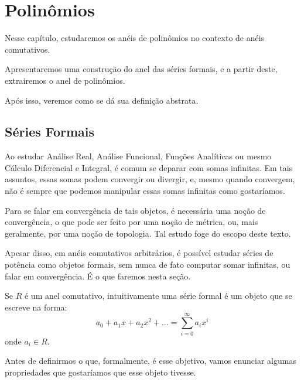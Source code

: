 
\chapter{Polinômios}
Nesse capítulo, estudaremos os anéis de polinômios no contexto de anéis comutativos.

Apresentaremos uma construção do anel das séries formais, e a partir deste, extrairemos o anel de polinômios.

Após isso, veremos como se dá sua definição abstrata.
\section{Séries Formais}
Ao estudar Análise Real, Análise Funcional, Funções Analíticas ou mesmo Cálculo Diferencial e Integral, é comum se deparar com somas infinitas. Em tais assuntos, essas somas podem convergir ou divergir, e, mesmo quando convergem, não é sempre que podemos manipular essas somas infinitas como gostaríamos.

Para se falar em convergência de tais objetos, é necessária uma noção de convergência, o que pode ser feito por uma noção de métrica, ou, mais geralmente, por uma noção de topologia.
Tal estudo foge do escopo deste texto.

Apesar disso, em anéis comutativos arbitrários, é possível estudar séries de potência como objetos formais, sem nunca de fato computar somar infinitas, ou falar em convergência. É o que faremos nesta seção.


Se $R$ é um anel comutativo, intuitivamente uma série formal é um objeto que se escreve na forma:
$$a_0+a_1x+a_2x^2+\dots=\sum_{i=0}^\infty a_ix^i$$
onde $a_i\in R$.

Antes de definirmos o que, formalmente, é esse objetivo, vamos enunciar algumas propriedades que gostaríamos que esse objeto tivesse.

